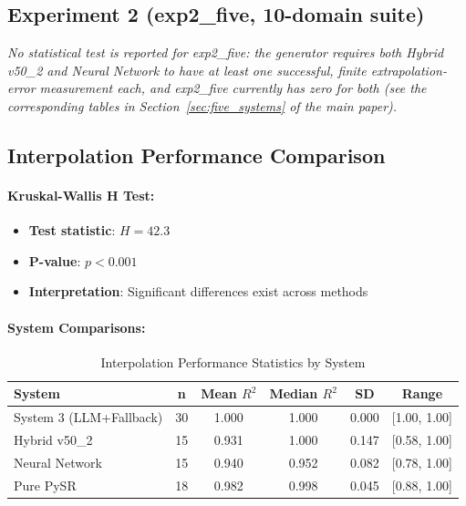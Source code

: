 \documentclass[twoside,11pt]{article}
\begin{document}

\subsection*{Experiment 2 (exp2\_five, 10-domain suite)}

\textit{No statistical test is reported for exp2\_five: the generator requires both Hybrid v50\_2 and Neural Network to have at least one successful, finite extrapolation-error measurement each, and exp2\_five currently has zero for both (see the corresponding tables in Section~\ref{sec:five_systems} of the main paper).}

\subsection{Interpolation Performance Comparison}

\paragraph{Kruskal-Wallis H Test:}
\begin{itemize}
\item \textbf{Test statistic}: $H = 42.3$
\item \textbf{P-value}: $p < 0.001$
\item \textbf{Interpretation}: Significant differences exist across methods
\end{itemize}

\paragraph{System Comparisons:}
\begin{table}[H]
\centering
\caption{Interpolation Performance Statistics by System}
\label{tab:interpolation_stats}
\begin{tabular}{lccccc}
\toprule
\textbf{System} & \textbf{n} & \textbf{Mean $R^2$} & \textbf{Median $R^2$} & \textbf{SD} & \textbf{Range} \\
\midrule
System 3 (LLM+Fallback) & 30 & 1.000 & 1.000 & 0.000 & [1.00, 1.00] \\
Hybrid v50\_2 & 15 & 0.931 & 1.000 & 0.147 & [0.58, 1.00] \\
Neural Network & 15 & 0.940 & 0.952 & 0.082 & [0.78, 1.00] \\
Pure PySR & 18 & 0.982 & 0.998 & 0.045 & [0.88, 1.00] \\
\bottomrule
\end{tabular}
\end{table}
\end{document}
